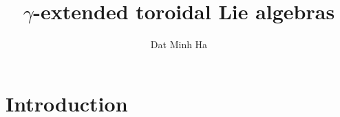

\setcounter{section}{-1}


\newcommand{\toroidal}{\t}
\newcommand{\extendedtoroidal}{\hat{\t}}
\newcommand{\divzero}{\der_{\gamma}(A)}



    \title{\texorpdfstring{$\gamma$}{}-extended toroidal Lie algebras}
    
    \author{Dat Minh Ha}
    \maketitle
    
    \begin{abstract}
    
    \end{abstract}
    
    {
    \hypersetup{} 
    \tableofcontents %
    }

    \listoftodos

    \section{Introduction}

    

    

    

    

    \begin{appendices}
        
    \end{appendices}
    
    \printbibliography

